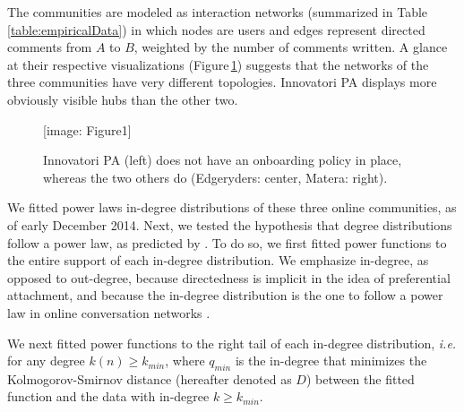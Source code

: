 \documentclass{bmcart}
\def\texttt{[image: ]}
\begin{document}
The communities are modeled as interaction networks (summarized in Table \ref{table:empiricalData}) in which nodes are users and edges represent directed comments from $A$ to $B$, weighted by the number of comments written. A glance at their respective visualizations (Figure\,\ref{fig:NetViz}) suggests that the networks of the three communities have very different topologies. Innovatori PA displays more obviously visible hubs than the other two. 

\begin{figure}[h!]
\texttt{[image: Figure1]}
\caption{ Innovatori PA (left) does not have an onboarding policy in place, whereas the two others do (Edgeryders: center, Matera: right).}
\label{fig:NetViz}
\end{figure}


We fitted power laws in-degree distributions of these three online communities, as of early December 2014. Next, we tested the hypothesis that degree distributions follow a power law, as predicted by \cite{dorogovtsev2002evolution}. To do so, we first fitted power functions to the entire support of each in-degree distribution. We emphasize in-degree, as opposed to out-degree, 
because directedness is implicit in the idea of preferential attachment, and because the in-degree distribution is the one to follow a power law in online conversation networks \cite{dorogovtsev2002evolution}.

We next fitted power functions to the right tail of each in-degree distribution, \emph{i.e.} for any degree $k(n) \geq k_{min}$, where $q_{min}$ is the in-degree that minimizes the Kolmogorov-Smirnov distance (hereafter denoted as $D$) between the fitted function and the data with in-degree $k \geq k_{min}$. 
\end{document}
